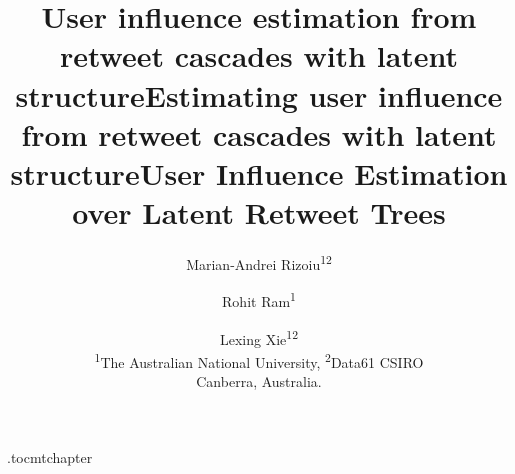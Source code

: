 \documentclass[letterpaper]{article} %
\begin{document}
\etocdepthtag.toc{mtchapter}
%
\title{User influence estimation from retweet cascades with latent structure}
\title{Estimating user influence from retweet cascades with latent structure}
\title{User Influence Estimation over Latent Retweet Trees}
\author{
	Marian-Andrei Rizoiu\textsuperscript{1}\textsuperscript{2}
	\and Rohit Ram\textsuperscript{1}
	\and Lexing Xie\textsuperscript{1}\textsuperscript{2}\\
	\textsuperscript{1}The Australian National University,
	\textsuperscript{2}Data61 CSIRO\\
	Canberra, Australia.\\
}

\maketitle

\begin{abstract}
	
\end{abstract}




%
%
%
%
%
%
%
%
%
%
%

{ %
	\fontsize{9.0pt}{10.0pt}
	\selectfont
	
	
}

%
\end{document}
